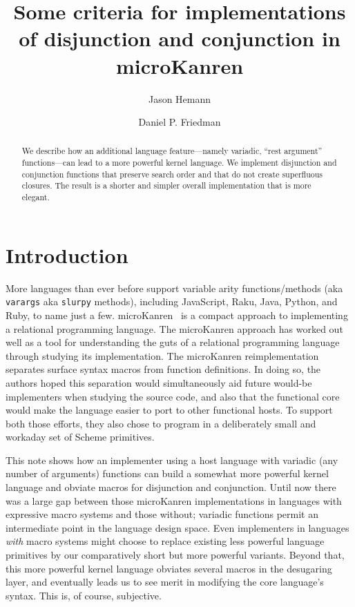 \documentclass[sigplan,screen,draft,anonymous,review,natbib=false]{acmart}
\begin{document}
\title[Some criteria for implementations of conj and disj in
microKanren]{Some criteria for implementations of disjunction and
  conjunction in microKanren}

\author{Jason Hemann}
\author{Daniel P. Friedman}

\renewcommand{\shortauthors}{Hemann et al.}

\begin{abstract}
  We describe how an additional language feature---namely variadic,
  \enquote{rest argument} functions---can lead to a more powerful
  kernel language. We implement disjunction and conjunction functions
  that preserve search order and that do not create superfluous
  closures. The result is a shorter and simpler overall implementation
  that is more elegant.
\end{abstract}

\keywords{}

\maketitle

\section{Introduction}

More languages than ever before support variable arity
functions/methods (aka \verb|varargs| aka \verb|slurpy| methods),
including JavaScript, Raku, Java, Python, and Ruby, to name just a
few. microKanren~\cite{hemann2013muKanren} is a compact approach to
implementing a relational programming language. The microKanren
approach has worked out well as a tool for understanding the guts of a
relational programming language through studying its implementation.
The microKanren reimplementation separates surface syntax macros from
function definitions. In doing so, the authors hoped this separation
would simultaneously aid future would-be implementers when studying
the source code, and also that the functional core would make the
language easier to port to other functional hosts. To support both
those efforts, they also chose to program in a deliberately small and
workaday set of Scheme primitives.

This note shows how an implementer using a host language with variadic
(any number of arguments) functions can build a somewhat more powerful
kernel language and obviate macros for disjunction and conjunction.
Until now there was a large gap between those microKanren
implementations in languages with expressive macro systems and those
without; variadic functions permit an intermediate point in the
language design space. Even implementers in languages \emph{with}
macro systems might choose to replace existing less powerful language
primitives by our comparatively short but more powerful variants.
Beyond that, this more powerful kernel language obviates several
macros in the desugaring layer, and eventually leads us to see merit
in modifying the core language's syntax. This is, of course,
subjective.
\end{document}
